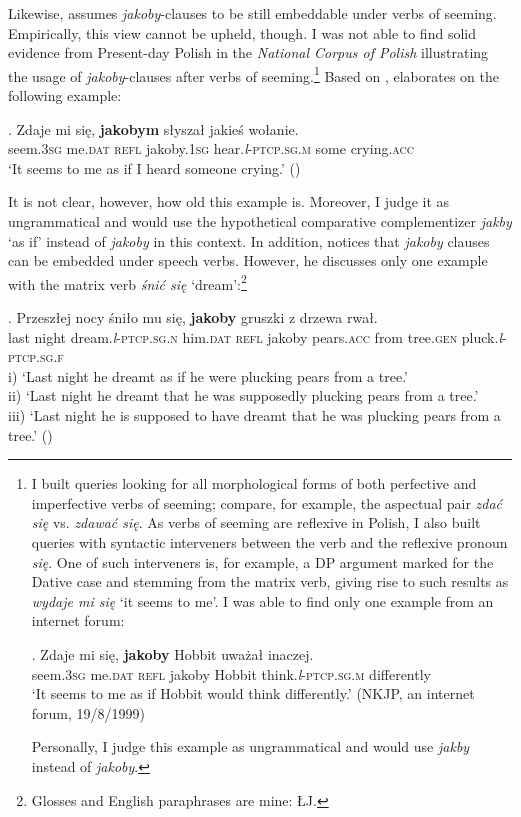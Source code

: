 \documentclass[output=paper
,modfonts
,nonflat]{langsci/langscibook}
\newcommand{\glossformat}[1]{\textsc{#1}}
\newcommand{\firstperson}{\glossformat{1}\xspace}
\newcommand{\thirdperson}{\glossformat{3}\xspace}
\newcommand{\acc}{\glossformat{acc}\xspace}
\newcommand{\dat}{\glossformat{dat}\xspace}
\newcommand{\fem}{\glossformat{f}\xspace}
\newcommand{\gen}{\glossformat{gen}\xspace}
\newcommand{\lptcp}{\emph{l}\glossformat{-ptcp}\xspace}
\newcommand{\masc}{\glossformat{m}\xspace}
\newcommand{\n}{\glossformat{n}\xspace}
\newcommand{\refl}{\glossformat{refl}\xspace}
\newcommand{\sg}{\glossformat{sg}\xspace}
\newcommand{\nquelle}[1]{\newline\phantom{x}\hfill(#1)}
\begin{document}
Likewise, \textcite{Wiemer2005} assumes \emph{jakoby}-clauses to be still embeddable under verbs of seeming. Empirically, this view cannot be upheld, though. I was not able to find solid evidence from Present-day Polish in the \emph{National Corpus of Polish} illustrating the usage of \emph{jakoby}-clauses after verbs of seeming.\footnote{I built queries looking for all morphological forms of both perfective and imperfective verbs of seeming; compare, for example, the aspectual pair \emph{zdać się} vs. \emph{zdawać się}. As verbs of seeming are reflexive in Polish, I also built queries with syntactic interveners between the verb and the reflexive pronoun \emph{się}. One of such interveners is, for example, a DP argument marked for the Dative case and stemming from the matrix verb, giving rise to such results as \emph{wydaje mi się} `it seems to me'. I was able to find only one example from an internet forum:

\exg.		Zdaje mi się, \textbf{jakoby} Hobbit uważał inaczej. \\
		seem.{\thirdperson}{\sg} me.{\dat} {\refl} jakoby Hobbit think.{\lptcp}.{\sg}.{\masc} differently \\
		`It seems to me as if Hobbit would think differently.' \nquelle{NKJP, an internet forum, 19/8/1999}

Personally, I judge this example as ungrammatical and would use \emph{jakby} instead of \emph{jakoby}.       
}
Based on \textcite{ojasiewicz1992}, \textcite{Wiemer2005} elaborates on the following example:

\exg.		Zdaje mi się, \textbf{jakobym} słyszał jakieś wołanie. \\
		seem.{\thirdperson}{\sg} me.{\dat} {\refl} jakoby.{\firstperson}{\sg} hear.{\lptcp}.{\sg}.{\masc} some crying.{\acc} \\
		`It seems to me as if I heard someone crying.' \nquelle{\citealt[105]{ojasiewicz1992}}

It is not clear, however, how old this example is. Moreover, I judge it as ungrammatical and would use the hypothetical comparative complementizer \emph{jakby} `as if' instead of \emph{jakoby} in this context. In addition, \textcite[122-124]{Wiemer2005} notices that \emph{jakoby} clauses can be embedded under speech verbs. However, he discusses only one example with the matrix verb \emph{śnić się} `dream':\footnote{Glosses and English paraphrases are mine: ŁJ.
}

\exg.		Przeszłej nocy śniło mu się, \textbf{jakoby} gruszki z drzewa rwał. \label{gruszki} \\
		last night dream.{\lptcp}.{\sg}.{\n} him.{\dat} {\refl} jakoby pears.{\acc} from tree.{\gen} pluck.{\lptcp}.{\sg}.{\fem} \\
		i) `Last night he dreamt as if he were plucking pears from a tree.' \\
		ii) `Last night he dreamt that he was supposedly plucking pears from a tree.' \\
		iii) `Last night he is supposed to have dreamt that he was plucking pears from a tree.'   \nquelle{\citealt[123, ex. 22]{Wiemer2005}}
		
\end{document}
